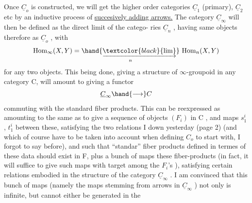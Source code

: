 Once $\underline{C}_o$ is constructed, we will get the higher order categories
$\underline{C}_1$ (primary), $\underline{C}_2$ etc by an inductive process of \uline{succesively adding arrows.}
The category $\underline{C}_\infty$ will then be defined as the direct limit of the catego-%
ries $\underline{C}_n$ , having  same objects therefore as $\underline{C}_o$ , with
\[ \mathrm{Hom}_\infty(X,Y) = \underset{n}{\hand{\underrightarrow{\textcolor{black}{\mathrm{lim}}}}}\ \mathrm{Hom}_n(X,Y) \]
for any two objects. This being done, giving a structure of $\infty$-groupoid
in any category C, will amount to giving a functor
\[ \underline{C}_\infty \hand{\longrightarrow} C \]
commuting with the standard  fiber products. This can be reexpressed\inserted{,} as
amounting to the same as to give a sequence of objects $(F_i)$ in C , 
and maps $s^i_1$ , $t^i_1$ between these, satisfying the two  relations I  down
yesterday (page 2) (and which of course have to be taken into account
when defining $C_o$ to start with, I forgot to say before), and such that
``standar'' fiber products  defined in termes of these data should exist in
F, plus a bunch of maps  these fiber-products  (in fact, it will
suffice to give such maps with target among the $F_i$'s ), satisfying
certain relations embodied in the structure of the category $\underline{C}_\infty$ . I am
convinced that this bunch of maps (namely the maps stemming from arrows
in $\underline{C}_\infty$ ) not only is infinite, but cannot either be generated in the

